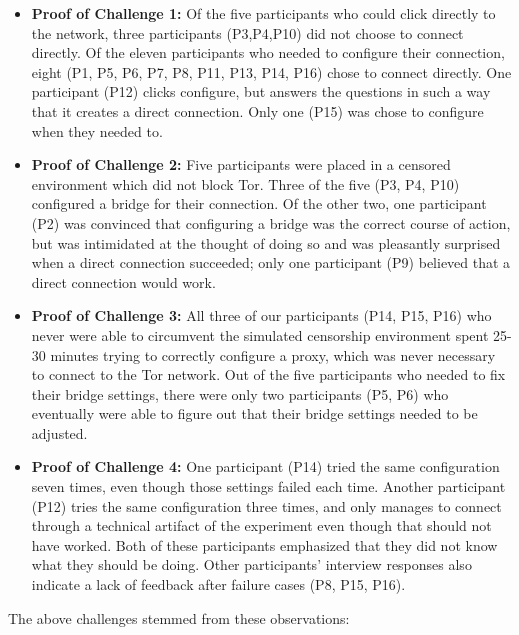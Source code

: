 \documentclass{template}
\begin{document}
\begin{itemize} \itemsep1pt \parskip0pt 
\item {\bfseries Proof of Challenge 1:} Of the five participants who could click directly to the network, three participants (P3,P4,P10) did not choose to connect directly.  Of the eleven participants who needed to configure their connection, eight (P1, P5, P6, P7, P8, P11, P13, P14, P16) chose to connect directly. One participant (P12) clicks configure, but answers the questions in such a way that it creates a direct connection. Only one (P15) was chose to configure when they needed to.
\item {\bfseries Proof of Challenge 2:} Five participants were placed in a censored environment which did not block Tor. Three of the five (P3, P4, P10) configured a bridge for their connection. Of the other two, one participant (P2) was convinced that configuring a bridge was the correct course of action, but was intimidated at the thought of doing so and was pleasantly surprised when a direct connection succeeded; only one participant (P9) believed that a direct connection would work. 
\item {\bfseries Proof of Challenge 3:} All three of our participants (P14, P15, P16) who never were able to circumvent the simulated censorship environment spent 25-30 minutes trying to correctly configure a proxy, which was never necessary to connect to the Tor network. Out of the five participants who needed to fix their bridge settings, there were only two participants (P5, P6) who eventually were able to figure out that their bridge settings needed to be adjusted.
\item {\bfseries Proof of Challenge 4:} One participant (P14) tried the same configuration seven times, even though those settings failed each time. Another participant (P12) tries the same configuration three times, and only manages to connect through a technical artifact of the experiment even though that should not have worked. Both of these participants emphasized that they did not know what they should be doing. Other participants' interview responses also indicate a lack of feedback after failure cases (P8, P15, P16). 
\end{itemize}

The above challenges stemmed from these observations: 
\end{document}
